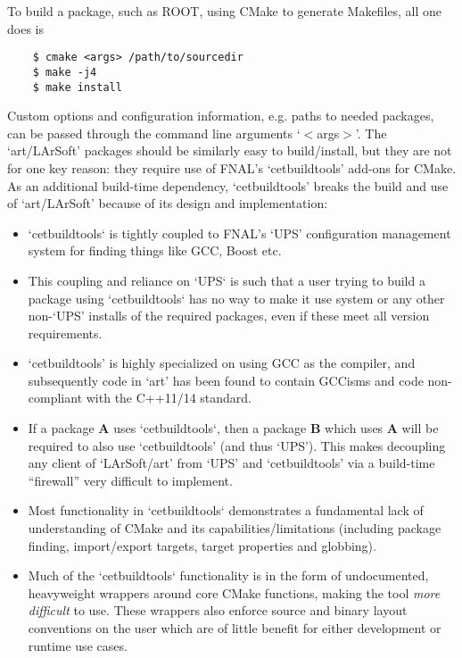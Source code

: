 \documentclass[usletter]{article}
\begin{document}
To build a package, such as ROOT, using CMake to generate Makefiles, all one
does is
\begin{verbatim}
    $ cmake <args> /path/to/sourcedir
    $ make -j4
    $ make install
 \end{verbatim}

Custom options and configuration information, e.g. paths to needed packages,
can be passed through the command line arguments `$<$args$>$'. The `art/LArSoft'
packages should be similarly easy to build/install, but they are not for one
key reason: they require use of FNAL's `cetbuildtools' add-ons for CMake.
As an additional build-time dependency, `cetbuildtools' breaks the build
and use of `art/LArSoft' because of its design and implementation:
\begin{itemize}

	\item `cetbuildtools` is tightly coupled to FNAL's `UPS' configuration
  management system for finding things like GCC, Boost etc.
  
	\item This coupling and reliance on `UPS` is such that a user trying to build a
  package using `cetbuildtools` has no way to
  make it use system or any other non-`UPS' installs of the required packages,
  even if these meet all version requirements.
  
	\item `cetbuildtools' is highly specialized on using GCC as the compiler, and
  subsequently code in `art' has been found to contain GCCisms and code
  non-compliant with the C++11/14 standard.
  
	\item If a package \textbf{A} uses `cetbuildtools`, then a package \textbf{B} which uses \textbf{A}
  will be required to also use `cetbuildtools' (and thus `UPS'). This makes
  decoupling any client of `LArSoft/art' from `UPS' and `cetbuildtools' via
  a build-time ``firewall'' very difficult to implement.
  
	\item Most functionality in `cetbuildtools` demonstrates a fundamental
  lack of understanding of CMake and its capabilities/limitations (including
  package finding, import/export targets, target properties and globbing).
  
	\item Much of the `cetbuildtools` functionality is in the form of undocumented,
  heavyweight wrappers around core CMake functions, making the tool \textit{more
  difficult} to use. These wrappers also enforce source and binary layout
  conventions on the user which are of little benefit for either development
  or runtime use cases.
\end{itemize}
\end{document}
